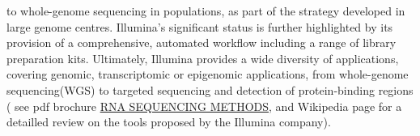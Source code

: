 {{to whole-genome sequencing in populations, as part of the strategy developed in large genome centres. 
Illumina's significant status is further highlighted by its provision of a comprehensive, automated workflow
 including a range of library preparation kits.
Ultimately, Illumina provides a wide diversity of applications, covering genomic, transcriptomic or epigenomic applications,
from whole-genome sequencing(WGS) to targeted sequencing and detection of protein-binding regions (
see pdf brochure \href{https://emea.illumina.com/content/dam/illumina-marketing/documents/products/research_reviews/rna-sequencing-methods-review-web.pdf}{RNA SEQUENCING
METHODS}, \autocite[Chapter 3: Illumina DNA-to-Data NGS Solutions]{illumina23} and Wikipedia page \autocite{pasteurinstitute23} 
for a detailled review on the tools proposed by the Illumina company).
}}


